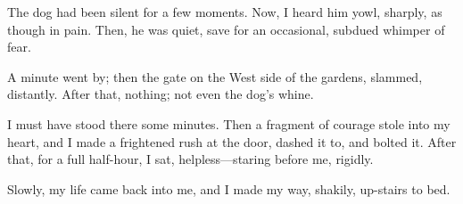 The dog had been silent for a few moments. Now, I heard him yowl, sharply, as though in pain. Then, he was quiet, save for an occasional, subdued whimper of fear.

A minute went by; then the gate on the West side of the gardens, slammed, distantly. After that, nothing; not even the dog’s whine.

I must have stood there some minutes. Then a fragment of courage stole into my heart, and I made a frightened rush at the door, dashed it to, and bolted it. After that, for a full half-hour, I sat, helpless---staring before me, rigidly.

Slowly, my life came back into me, and I made my way, shakily, up-stairs to bed.

\clearpage
